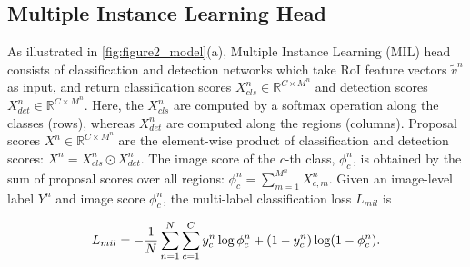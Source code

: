 \documentclass[runningheads]{llncs}
\begin{document}
\subsection{Multiple Instance Learning Head}
\label{sec:MIL}
As illustrated in \cref{fig:figure2_model}(a), Multiple Instance Learning (MIL) head consists of classification and detection networks which take RoI feature vectors $\tilde{v}^n$ as input, and return classification scores $X^{n}_{cls} \in\mathbb{R}^{C \times M^n}$ and detection scores $X^{n}_{det} \in\mathbb{R}^{C \times M^n}$. Here, the $X^{n}_{cls}$ are computed by a softmax operation along the classes (rows), whereas $X^{n}_{det}$ are computed along the regions (columns).
Proposal scores $X^{n} \in\mathbb{R}^{C\times M^n}$ are the element-wise product of classification and detection scores: $X^{n}=X^{n}_{cls} \odot X^{n}_{det}$.
The image score of the $c$-th class, $\phi^{n}_c$, is obtained by the sum of proposal scores over all regions: $\phi^{n}_c = \sum_{m=1}^{M^n} X^{n}_{c,m}$.
Given an image-level label $Y^n$ and image score $\phi^{n}_c$, the multi-label classification loss $L_{mil}$ is
  
\begin{equation}
\small
    L_{mil} = -\frac{1}{N}\sum_{n=1}^{N}\sum_{c=1}^{C} {y^{n}_c\log\phi^{n}_c + (1-y^{n}_c)\log(1-\phi^{n}_c)}
\label{eq:mil_loss}
.\end{equation}\par
\end{document}
